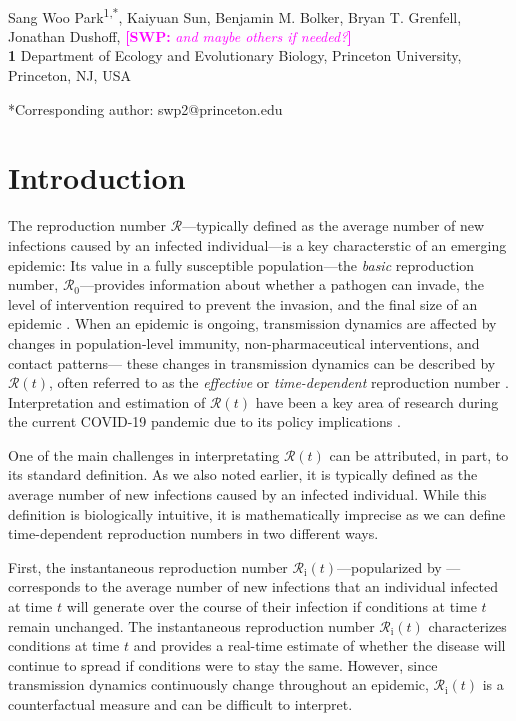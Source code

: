 \documentclass[12pt]{article}
\date{\today}
\newcommand{\comment}{\showcomment}
\newcommand{\showcomment}[3]{\textcolor{#1}{\textbf{[#2: }\textsl{#3}\textbf{]}}}
\newcommand{\swp}[1]{\comment{magenta}{SWP}{#1}}
\newcommand{\Rx}[1]{\ensuremath{{\mathcal R}_{#1}}\xspace}
\newcommand{\Ro}{\Rx{0}}
\newcommand{\Ri}{\Rx{\mathrm{i}}}
\newcommand{\RR}{\ensuremath{{\mathcal R}}\xspace}
\begin{document}
\begin{flushleft}{
	\Large
	\textbf{}
}
\newline
\\
Sang Woo Park\textsuperscript{1,*}, Kaiyuan Sun, Benjamin M. Bolker, Bryan T. Grenfell, Jonathan Dushoff, \swp{and maybe others if needed?}
\\
\bigskip
\textbf{1} Department of Ecology and Evolutionary Biology, Princeton University, Princeton, NJ, USA
\\
\bigskip

*Corresponding author: swp2@princeton.edu
\end{flushleft}

\section{Introduction}

The reproduction number \RR---typically defined as the average number of new infections caused by an infected individual---is a key characterstic of an emerging epidemic:
Its value in a fully susceptible population---the \emph{basic} reproduction number, \Ro---provides information about whether a pathogen can invade, the level of intervention required to prevent the invasion, and the final size of an epidemic \citep{diekmann1990definition,anderson1991infectious}.
When an epidemic is ongoing, transmission dynamics are affected by changes in population-level immunity, non-pharmaceutical interventions, and contact patterns---
these changes in transmission dynamics can be described by $\RR(t)$, often referred to as the \emph{effective} or \emph{time-dependent} reproduction number \citep{wallinga2004different, fraser2007estimating, cori2013new}.
Interpretation and estimation of $\RR(t)$ have been a key area of research during the current COVID-19 pandemic due to its policy implications \citep{pan2020association,flaxman2020estimating,gostic2020practical}.

One of the main challenges in interpretating $\RR(t)$ can be attributed, in part, to its standard definition.
As we also noted earlier, it is typically defined as the average number of new infections caused by an infected individual.
While this definition is biologically intuitive, it is mathematically imprecise as we can define time-dependent reproduction numbers in two different ways.

First, the instantaneous reproduction number $\Ri(t)$---popularized by \cite{cori2013new}---corresponds to the average number of new infections that an individual infected at time $t$ will generate over the course of their infection if conditions at time $t$ remain unchanged.
The instantaneous reproduction number $\Ri(t)$ characterizes conditions at time $t$ and provides a real-time estimate of whether the disease will continue to spread if conditions were to stay the same.
However, since transmission dynamics continuously change throughout an epidemic, $\Ri(t)$ is a counterfactual measure and can be difficult to interpret.
\end{document}
